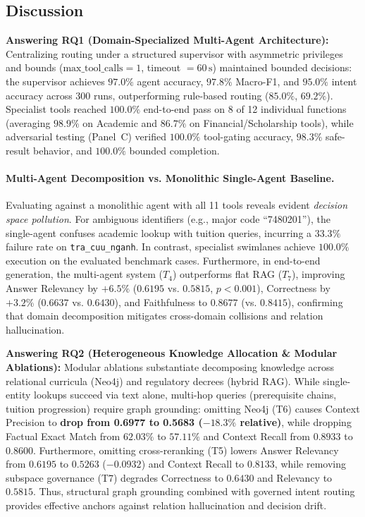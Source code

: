 \subsection{Discussion}
\label{sec:discussion}

\textbf{Answering RQ1 (Domain-Specialized Multi-Agent Architecture):} Centralizing routing under a structured supervisor with asymmetric privileges and bounds ($\text{max\_tool\_calls}=1$, timeout $=60\,\text{s}$) maintained bounded decisions: the supervisor achieves $97.0\%$ agent accuracy, $97.8\%$ Macro-F1, and $95.0\%$ intent accuracy across 300 runs, outperforming rule-based routing ($85.0\%$, $69.2\%$). Specialist tools reached $100.0\%$ end-to-end pass on 8 of 12 individual functions (averaging $98.9\%$ on Academic and $86.7\%$ on Financial/Scholarship tools), while adversarial testing (Panel~C) verified $100.0\%$ tool-gating accuracy, $98.3\%$ safe-result behavior, and $100.0\%$ bounded completion.

\paragraph{Multi-Agent Decomposition vs. Monolithic Single-Agent Baseline.}
Evaluating against a monolithic agent with all 11 tools reveals evident \textit{decision space pollution}. For ambiguous identifiers (e.g., major code ``7480201''), the single-agent confuses academic lookup with tuition queries, incurring a $33.3\%$ failure rate on \texttt{tra\_cuu\_nganh}. In contrast, specialist swimlanes achieve $100.0\%$ execution on the evaluated benchmark cases. Furthermore, in end-to-end generation, the multi-agent system ($T_4$) outperforms flat RAG ($T_7$), improving Answer Relevancy by $+6.5\%$ ($0.6195$ vs. $0.5815$, $p < 0.001$), Correctness by $+3.2\%$ ($0.6637$ vs. $0.6430$), and Faithfulness to $0.8677$ (vs. $0.8415$), confirming that domain decomposition mitigates cross-domain collisions and relation hallucination.

\textbf{Answering RQ2 (Heterogeneous Knowledge Allocation \& Modular Ablations):} Modular ablations substantiate decomposing knowledge across relational curricula (Neo4j) and regulatory decrees (hybrid RAG). While single-entity lookups succeed via text alone, multi-hop queries (prerequisite chains, tuition progression) require graph grounding: omitting Neo4j (T6) causes Context Precision to \textbf{drop from 0.6977 to 0.5683 ($-18.3\%$ relative)}, while dropping Factual Exact Match from $62.03\%$ to $57.11\%$ and Context Recall from $0.8933$ to $0.8600$. Furthermore, omitting cross-reranking (T5) lowers Answer Relevancy from $0.6195$ to $0.5263$ ($-0.0932$) and Context Recall to $0.8133$, while removing subspace governance (T7) degrades Correctness to $0.6430$ and Relevancy to $0.5815$. Thus, structural graph grounding combined with governed intent routing provides effective anchors against relation hallucination and decision drift.

